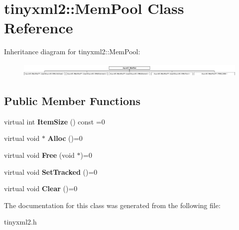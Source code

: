 \hypertarget{classtinyxml2_1_1_mem_pool}{}\section{tinyxml2\+:\+:Mem\+Pool Class Reference}
\label{classtinyxml2_1_1_mem_pool}
Inheritance diagram for tinyxml2\+:\+:Mem\+Pool\+:\begin{figure}[H]
\begin{center}
\leavevmode
\includegraphics[height=0.691358cm]{classtinyxml2_1_1_mem_pool}
\end{center}
\end{figure}
\subsection*{Public Member Functions}
\begin{DoxyCompactItemize}
\item 
\hypertarget{classtinyxml2_1_1_mem_pool_afb3d8c6cbe91b44f90043d0d94dc7306}{}virtual int {\bfseries Item\+Size} () const  =0\label{classtinyxml2_1_1_mem_pool_afb3d8c6cbe91b44f90043d0d94dc7306}

\item 
\hypertarget{classtinyxml2_1_1_mem_pool_a4f977b5fed752c0bbfe5295f469d6449}{}virtual void $\ast$ {\bfseries Alloc} ()=0\label{classtinyxml2_1_1_mem_pool_a4f977b5fed752c0bbfe5295f469d6449}

\item 
\hypertarget{classtinyxml2_1_1_mem_pool_a49e3bfac2cba2ebd6776b31e571f64f7}{}virtual void {\bfseries Free} (void $\ast$)=0\label{classtinyxml2_1_1_mem_pool_a49e3bfac2cba2ebd6776b31e571f64f7}

\item 
\hypertarget{classtinyxml2_1_1_mem_pool_ac5804dd1387b2e4de5eef710076a0db1}{}virtual void {\bfseries Set\+Tracked} ()=0\label{classtinyxml2_1_1_mem_pool_ac5804dd1387b2e4de5eef710076a0db1}

\item 
\hypertarget{classtinyxml2_1_1_mem_pool_a74fcdef9756917c8ae19fbbb4d658ed7}{}virtual void {\bfseries Clear} ()=0\label{classtinyxml2_1_1_mem_pool_a74fcdef9756917c8ae19fbbb4d658ed7}

\end{DoxyCompactItemize}


The documentation for this class was generated from the following file\+:\begin{DoxyCompactItemize}
\item 
tinyxml2.\+h\end{DoxyCompactItemize}
